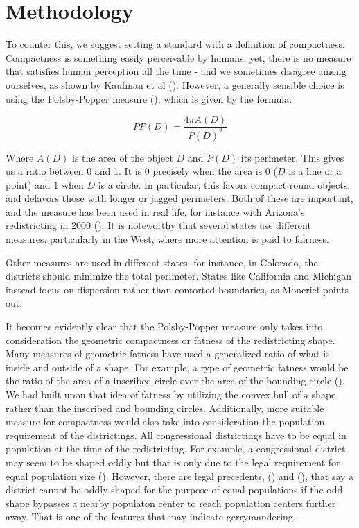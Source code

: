 \documentclass[letterpaper]{article}
\begin{document}
\section{Methodology}
To counter this, we suggest setting a standard with a definition of compactness. Compactness is something easily perceivable by humans, yet, there is no measure that satisfies human perception all the time - and we sometimes disagree among ourselves, as shown by Kaufman et al (\cite{king}).
However, a generally sensible choice is using the Polsby-Popper measure (\cite{polsbypopper}), which is given by the formula:

\[
	PP(D) = \frac{4\pi A(D)}{P(D)^2}
\]


Where $A(D)$ is the area of the object $D$ and $P(D)$ its perimeter. This gives us a ratio between 0 and 1. It is 0 precisely when the area is 0 ($D$ is a line or a point) and 1 when $D$ is a circle. In particular, this favors compact round objects, and defavors those with longer or jagged perimeters. Both of these are important, and the measure has been used in real life, for instance with Arizona’s redistricting in 2000 (\cite{moncrief}). It is noteworthy that several states use different measures, particularly in the West, where more attention is paid to fairness.

Other measures are used in different states: for instance, in Colorado, the districts should minimize the total perimeter. States like California and Michigan instead focus on dispersion rather than contorted boundaries, as Moncrief points out. 

It becomes evidently clear that the Polsby-Popper measure only takes into consideration the geometric compactness or fatness of the redistricting shape. Many measures of geometric fatness have used a generalized ratio of what is inside and outside of a shape. For example, a type of geometric fatness would be the ratio of the area of a inscribed circle over the area of the bounding circle (\cite{fatness}). We had built upon that idea of fatness by utilizing the convex hull of a shape rather than the inscribed and bounding circles. Additionally, more suitable measure for compactness would also take into consideration the population requirement of the districtings. All congressional districtings have to be equal in population at the time of the redistricting. For example, a congressional district may seem to be shaped oddly but that is only due to the legal requirement for equal population size (\cite{westberryVsanders}). However, there are legal precedents, (\cite{sandiego}) and (\cite{california}), that say a district cannot be oddly shaped for the purpose of equal populations if the odd shape bypasses a nearby populaton center to reach population centers further away. That is one of the features that may indicate gerrymandering.
\end{document}
